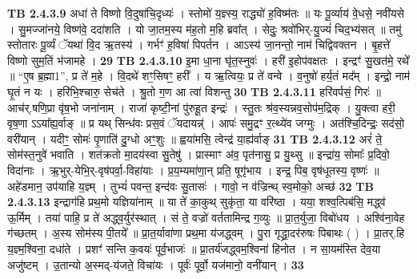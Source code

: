 \documentclass[17pt]{extarticle}
\begin{document}
                  \newline
                                \textbf{ TB 2.4.3.9} \newline
                  अधा॑ ते विष्णो वि॒दुषा॑चि॒दृध्यः॑ । स्तोमो॑ य॒ज्ञ्स्य॒ राद्ध्यो॑ ह॒विष्म॑तः ॥ यः पू॒र्व्याय॑ वे॒धसे॒ नवी॑यसे । सु॒मज्जा॑नये॒ विष्ण॑वे॒ ददा॑शति । यो जा॒तम॒स्य म॑ह॒तो म॒हि ब्रवा᳚त् । सेदुः॒ श्रवो॑भिर्-यु॒ज्यं॑ चिद॒भ्य॑सत् ॥ तमु॑ स्तोतारः पू॒र्व्यं ॅयथा॑ वि॒द ऋ॒तस्य॑ । गर्भꣳ॑ ह॒विषा॑ पिपर्तन । आऽस्य॑ जा॒नन्तो॒ नाम॑ चिद्विवक्तन । बृ॒हत्ते॑ विष्णो सुम॒तिं भ॑जामहे । \textbf{ 29} \newline
                  \newline
                                \textbf{ TB 2.4.3.10} \newline
                  इ॒मा धा॒ना घृ॑त॒स्नुवः॑ । हरी॑ इ॒होप॑वक्षतः । इन्द्रꣳ॑ सु॒खत॑मे॒ रथे᳚ ॥ “ए॒ष ब्र॒ह्मा{1}”, प्र ते॑ म॒हे । वि॒दथे॑ शꣳ॒सिषꣳ॒॒ हरी᳚ । य ऋ॒त्वियः॒ प्र ते॑ वन्वे । व॒नुषो॑ हर्य॒तं मद᳚म् । इन्द्रो॒ नाम॑ घृ॒तं न यः । हरि॑भि॒श्चारु॒ सेच॑ते । श्रु॒तो ग॒ण आ त्वा॑ विशन्तु \textbf{ 30} \newline
                  \newline
                                \textbf{ TB 2.4.3.11} \newline
                  हरि॑वर्पसं॒ गिरः॑ ॥ आच॑र्.षणि॒प्रा वृ॑ष॒भो जना॑नाम् । राजा॑ कृष्टी॒नां पु॑रुहू॒त इन्द्रः॑ । स्तु॒तः श्र॑व॒स्यन्नव॒सोप॑म॒द्रिक् । यु॒क्त्वा हरी॒ वृष॒णा ऽऽया᳚ह्य॒र्वाङ् ॥ प्र यथ् सिन्ध॑वः प्रस॒वं ॅयदायन्न्॑ । आपः॑ समु॒द्रꣳ र॒त्थ्ये॑व जग्मुः । अत॑श्चि॒दिन्द्रः॒ सद॑सो॒ वरी॑यान् । यदीꣳ॒॒ सोमः॑ पृ॒णाति॑ दु॒ग्धो अꣳ॒॒शुः ॥ ह्वया॑मसि॒ त्वेन्द्र॑ या॒ह्य॑र्वाङ् \textbf{ 31} \newline
                  \newline
                                \textbf{ TB 2.4.3.12} \newline
                  अरं॑ ते॒ सोम॑स्त॒नुवे॑ भवाति । शत॑क्रतो मा॒दय॑स्वा सु॒तेषु॑ । प्रास्माꣳ अ॑व॒ पृत॑नासु॒ प्र यु॒थ्सु ॥ इन्द्रा॑य॒ सोमाः᳚ प्र॒दिवो॒ विदा॑नाः । ऋ॒भुर्-येभि॒र्-वृष॑पर्वा॒-विहा॑याः । प्र॒य॒म्यमा॑णा॒न् प्रति॒ षूगृ॑भाय । इन्द्र॒ पिब॒ वृष॑धूतस्य॒ वृष्णः॑ ॥ अहे॑डमान॒ उप॑याहि य॒ज्ञ्म् । तुभ्यं॑ पवन्त॒ इन्द॑वः सु॒तासः॑ । गावो॒ न व॑ज्रिन्थ् स्व॒मोको॒ अच्छ॑ \textbf{ 32} \newline
                  \newline
                                \textbf{ TB 2.4.3.13} \newline
                  इन्द्राग॑हि प्रथ॒मो यज्ञिया॑नाम् ॥ या ते॑ का॒कुथ् सुकृ॑ता॒ या वरि॑ष्ठा । यया॒ शश्व॒त्पिब॑सि॒ मद्ध्व॑ ऊ॒र्मिम् । तया॑ पाहि॒ प्र ते॑ अद्ध्व॒र्युर॑स्थात् । सं ते॒ वज्रो॑ वर्ततामिन्द्र ग॒व्युः ॥ प्रा॒त॒र्युजा॒ विबो॑धय । अश्वि॑ना॒वेह ग॑च्छतम् । अ॒स्य सोम॑स्य पी॒तये᳚ ॥ प्रा॒त॒र्यावा॑णा प्रथ॒मा य॑जद्ध्वम् । पु॒रा गृद्ध्रा॒दर॑रुषः पिबाथः ( ) । प्रा॒तर्.हि य॒ज्ञ्म॒श्विना॒ दधा॑ते । प्रशꣳ॑ सन्ति क॒वयः॑ पूर्व॒भाजः॑ ॥ प्रा॒तर्य॑जद्ध्वम॒श्विना॑ हिनोत । न सा॒यम॑स्ति देव॒या अजु॑ष्टम् । उ॒तान्यो अ॒स्मद्-य॑जते॒ विचा॑यः । पूर्वः॑ पूर्वो॒ यज॑मानो॒ वनी॑यान् । \textbf{ 33} \newline
\end{document}
